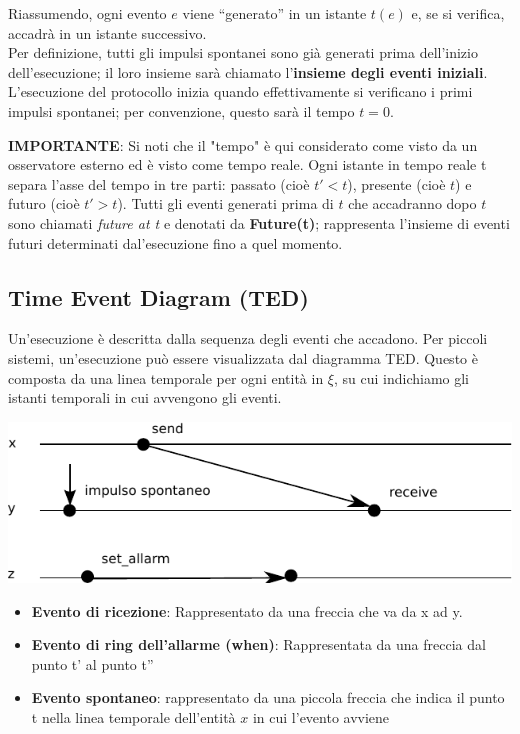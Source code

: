 Riassumendo, ogni evento $e$ viene “generato” in un istante $t(e)$ e, se si
verifica, accadrà in un istante successivo.\\
Per definizione, tutti gli impulsi spontanei sono già generati prima dell'inizio
dell'esecuzione; il loro insieme sarà chiamato l'\textbf{insieme degli eventi
    iniziali}. L'esecuzione del protocollo inizia quando effettivamente si
verificano i primi impulsi spontanei; per convenzione, questo sarà il tempo $t =
    0$.

\textbf{IMPORTANTE}: Si noti che il "tempo" è qui considerato come visto da un
osservatore esterno ed è visto come tempo reale. Ogni istante in tempo reale t
separa l'asse del tempo in tre parti: passato (cioè {$t' < t$}), presente (cioè
$t$) e futuro (cioè {$t' > t$}). Tutti gli eventi generati prima di $t$ che
accadranno dopo $t$ sono chiamati \textit{future at t} e denotati da
\textbf{Future(t)}; rappresenta l'insieme di eventi futuri determinati
dal'esecuzione fino a quel momento.

\subsection*{Time Event Diagram (TED)}
Un'esecuzione è descritta dalla sequenza degli eventi che accadono. Per piccoli
sistemi, un'esecuzione può essere visualizzata dal diagramma TED. Questo è
composta da una linea temporale per ogni entità in $\xi$, su cui indichiamo gli
istanti temporali in cui avvengono gli eventi.
\begin{center}
    \includegraphics[scale=0.8]{capitoli/introduzione_ambiente-distribuito/imgs/n_07}
\end{center}

\begin{itemize}
    \item \textbf{Evento di ricezione}: Rappresentato da una freccia che va da x
          ad y.
    \item \textbf{Evento di ring dell'allarme (when)}: Rappresentata da una
          freccia dal punto t' al punto t''
    \item \textbf{Evento spontaneo}: rappresentato da una piccola freccia che
          indica il punto t nella linea temporale dell'entità $x$ in cui l'evento
          avviene
\end{itemize}

